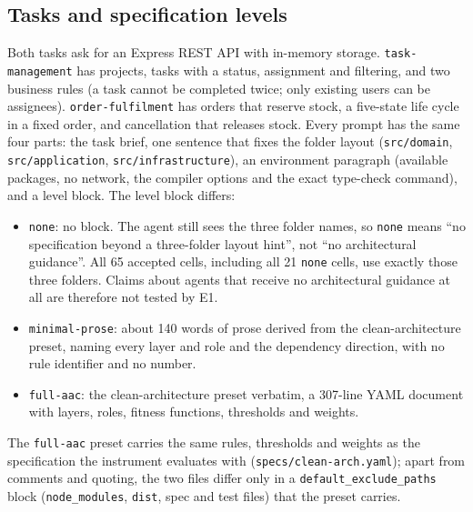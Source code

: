 \documentclass[10pt,a4paper]{article}
\newcommand{\lev}[1]{\texttt{\small #1}}
\begin{document}
\subsection{Tasks and specification levels}\label{sec:levels}

Both tasks ask for an Express REST API with in-memory storage. \texttt{task-management} has projects, tasks with a
status, assignment and filtering, and two business rules (a task cannot be completed twice; only existing users can
be assignees). \texttt{order-fulfilment} has orders that reserve stock, a five-state life cycle in a fixed order, and
cancellation that releases stock. %
Every prompt has the same four parts: the task brief, one sentence that fixes the folder layout (\texttt{src/domain},
\texttt{src/application}, \texttt{src/infrastructure}), an environment paragraph (available packages, no network,
the compiler options and the exact type-check command), and a level block. %
The level block differs:
\begin{itemize}
  \item \lev{none}: no block. The agent still sees the three folder names, so \lev{none} means ``no
        specification beyond a three-folder layout hint'', not ``no architectural guidance''. All 65 accepted cells,
        including all 21 \lev{none} cells, use exactly those three folders. Claims about agents that receive no
        architectural guidance at all are therefore not tested by E1. %
  \item \lev{minimal-prose}: about 140 words of prose derived from the clean-architecture preset, naming every layer
        and role and the dependency direction, with no rule identifier and no number. %
  \item \lev{full-aac}: the clean-architecture preset verbatim, a 307-line YAML document with layers, roles, fitness
        functions, thresholds and weights. %
\end{itemize}
The \lev{full-aac} preset carries the same rules, thresholds and weights as the specification the instrument
evaluates with (\texttt{specs/clean-arch.yaml}); apart from comments and quoting, the two files differ only in a
\texttt{default\_exclude\_paths} block (\texttt{node\_modules}, \texttt{dist}, spec and test files) that the preset carries.
\end{document}
